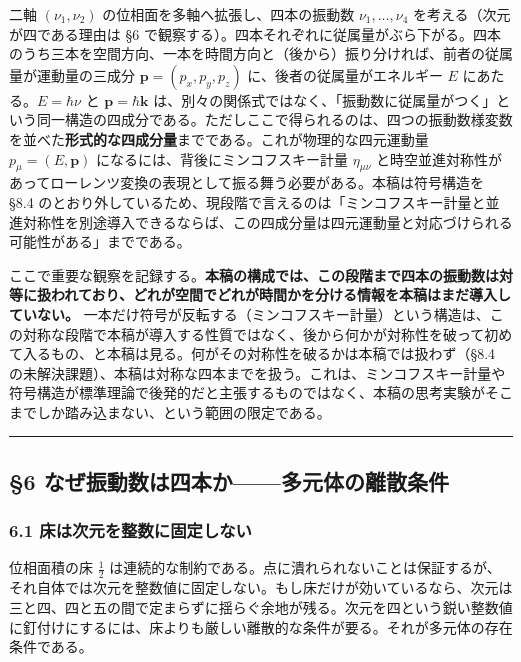 \documentclass[
]{ltjsarticle}
\begin{document}
二軸 \((\nu_1,\nu_2)\) の位相面を多軸へ拡張し、四本の振動数
\(\nu_1,\dots,\nu_4\) を考える（次元が四である理由は §6
で観察する）。四本それぞれに従属量がぶら下がる。四本のうち三本を空間方向、一本を時間方向と（後から）振り分ければ、前者の従属量が運動量の三成分
\(\boldsymbol{p}=(p_x,p_y,p_z)\) に、後者の従属量がエネルギー \(E\)
にあたる。\(E=\hbar\nu\) と \(\boldsymbol{p}=\hbar\boldsymbol{k}\)
は、別々の関係式ではなく、「振動数に従属量がつく」という同一構造の四成分である。ただしここで得られるのは、四つの振動数様変数を並べた\textbf{形式的な四成分量}までである。これが物理的な四元運動量
\(p_\mu=(E,\boldsymbol{p})\) になるには、背後にミンコフスキー計量
\(\eta_{\mu\nu}\)
と時空並進対称性があってローレンツ変換の表現として振る舞う必要がある。本稿は符号構造を
§8.4
のとおり外しているため、現段階で言えるのは「ミンコフスキー計量と並進対称性を別途導入できるならば、この四成分量は四元運動量と対応づけられる可能性がある」までである。

ここで重要な観察を記録する。\textbf{本稿の構成では、この段階まで四本の振動数は対等に扱われており、どれが空間でどれが時間かを分ける情報を本稿はまだ導入していない。}
一本だけ符号が反転する（ミンコフスキー計量）という構造は、この対称な段階で本稿が導入する性質ではなく、後から何かが対称性を破って初めて入るもの、と本稿は見る。何がその対称性を破るかは本稿では扱わず（§8.4
の未解決課題）、本稿は対称な四本までを扱う。これは、ミンコフスキー計量や符号構造が標準理論で後発的だと主張するものではなく、本稿の思考実験がそこまでしか踏み込まない、という範囲の限定である。

\begin{center}\rule{0.5\linewidth}{0.5pt}\end{center}

\subsection{§6
なぜ振動数は四本か------多元体の離散条件}\label{ux306aux305cux632fux52d5ux6570ux306fux56dbux672cux304bux591aux5143ux4f53ux306eux96e2ux6563ux6761ux4ef6}

\subsubsection{6.1
床は次元を整数に固定しない}\label{ux5e8aux306fux6b21ux5143ux3092ux6574ux6570ux306bux56faux5b9aux3057ux306aux3044}

位相面積の床 \(\tfrac12\)
は連続的な制約である。点に潰れられないことは保証するが、それ自体では次元を整数値に固定しない。もし床だけが効いているなら、次元は三と四、四と五の間で定まらずに揺らぐ余地が残る。次元を四という鋭い整数値に釘付けにするには、床よりも厳しい離散的な条件が要る。それが多元体の存在条件である。
\end{document}
